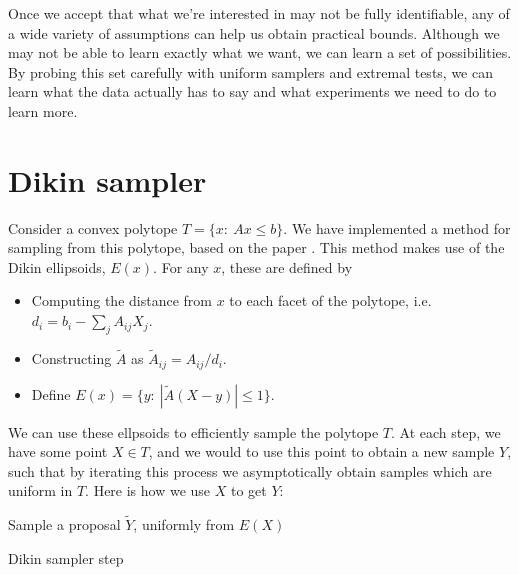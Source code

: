 Once we accept that what we're interested in may not be fully identifiable, any of a wide variety of assumptions can help us obtain practical bounds.  Although we may not be able to learn exactly what we want, we can learn a set of possibilities.  By probing this set carefully with uniform samplers and extremal tests, we can learn what the data actually has to say and what experiments we need to do to learn more.  




\appendix

\section{Dikin sampler}

\label{sec:dikin}

Consider a convex polytope $T=\{x:\ Ax\leq b\}$.  We have implemented a method for sampling from this polytope, based on the paper \citep{kannan2012random}.  This method makes use of the Dikin ellipsoids, $E(x)$.  For any $x$, these are defined by 

\begin{itemize}
    \item Computing the distance from $x$ to each facet of the polytope, i.e. $d_i = b_i - \sum_j A_{ij} X_j$.
    \item Constructing $\tilde A$ as $\tilde A_{ij} = A_{ij} / d_i$.
    \item Define $E(x) = \{y:\ |\tilde A (X-y)|\leq 1\}$.  
\end{itemize}

We can use these ellpsoids to efficiently sample the polytope $T$.    At each step, we have some point $X\in T$, and we would to use this point to obtain a new sample $Y$, such that by iterating this process we asymptotically obtain samples which are uniform in $T$.  Here is how we use $X$ to get $Y$:

\begin{algorithm}[H]
 \vspace{.1in}
  Sample a proposal $\tilde Y$, uniformly from $E(X)$\;
 \caption{Dikin sampler step}
\end{algorithm}

